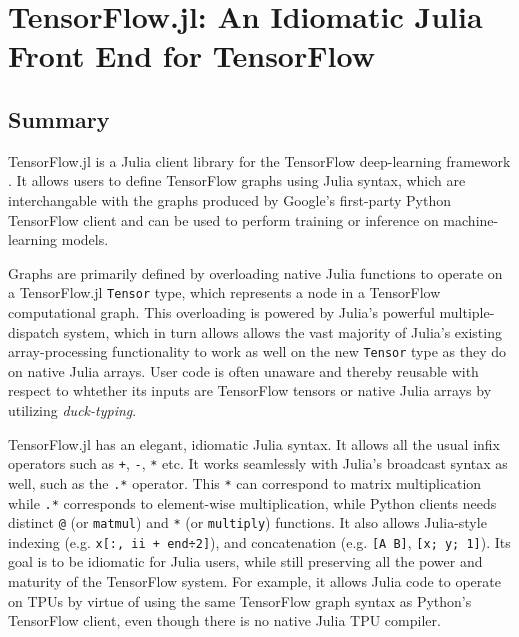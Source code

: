 \documentclass{book}
\begin{document}
\chapter{TensorFlow.jl: An Idiomatic Julia Front End for TensorFlow}

\section{Summary}

TensorFlow.jl is a Julia \citep{Julia} client library for the
TensorFlow deep-learning framework
\citep{tensorflow2015-whitepaper,tensorflow2016}. It allows users to define
TensorFlow graphs using Julia syntax, which are interchangable with the
graphs produced by Google's first-party Python TensorFlow client and can
be used to perform training or inference on machine-learning models.

Graphs are primarily defined by overloading native Julia functions to
operate on a TensorFlow.jl \texttt{Tensor} type, which represents a node
in a TensorFlow computational graph. This overloading is powered by
Julia's powerful multiple-dispatch system, which in turn allows allows
the vast majority of Julia's existing array-processing functionality to
work as well on the new \texttt{Tensor} type as they do on native Julia
arrays. User code is often unaware and thereby reusable with respect to
whtether its inputs are TensorFlow tensors or native Julia arrays by
utilizing \emph{duck-typing}.

TensorFlow.jl has an elegant, idiomatic Julia syntax. It allows all the
usual infix operators such as \texttt{+}, \texttt{-}, \texttt{*} etc. It
works seamlessly with Julia's broadcast syntax as well, such as the
\texttt{.*} operator. This \texttt{*} can correspond to matrix
multiplication while \texttt{.*} corresponds to element-wise
multiplication, while Python clients needs distinct \texttt{@} (or
\texttt{matmul}) and \texttt{*} (or \texttt{multiply}) functions. It
also allows Julia-style indexing (e.g.
\texttt{x{[}:,\ ii\ +\ end÷2{]}}), and concatenation (e.g.
\texttt{{[}A\ B{]}}, \texttt{{[}x;\ y;\ 1{]}}). Its goal is to be
idiomatic for Julia users, while still preserving all the power and
maturity of the TensorFlow system. For example, it allows Julia code to
operate on TPUs by virtue of using the same TensorFlow graph syntax as
Python's TensorFlow client, even though there is no native Julia TPU
compiler.
\end{document}
